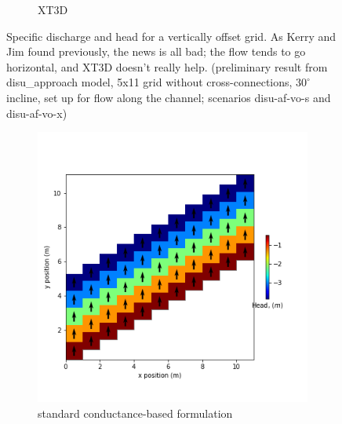 \documentclass{article}
\begin{document}
\begin{figure}[H]
\begin{subfigure}{0.4\textwidth}
	\caption{XT3D}
	\label{fig:disu-x-nocc-head}
\end{subfigure}
\caption{Specific discharge and head for a vertically offset grid. As Kerry and Jim found previously, the news is all bad; the flow tends to go horizontal, and XT3D doesn't really help. (preliminary result from disu\_approach model, 5x11 grid without cross-connections, $30^{\circ}$ incline, set up for flow along the channel; scenarios disu-af-vo-s and disu-af-vo-x)}
\label{fig:figures}
\end{figure}

\begin{figure}[H]
\centering
\begin{subfigure}{0.4\textwidth}
	\includegraphics[width=\textwidth]{../figures/disu-cf-vo-s-head.png}
	\caption{standard conductance-based formulation}
	\label{fig:disu-s-nocc-cf-head.}
\end{subfigure}
\hfill
\begin{subfigure}{0.4\textwidth}

\end{subfigure}
\end{figure}
\end{document}
